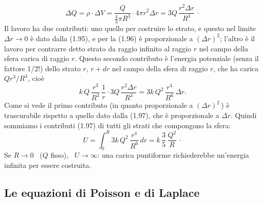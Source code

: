 \begin{enumerate}
\begin{equation}
\Delta Q=\rho\cdot\Delta V=\frac{Q}{\frac43\pi R^3}\cdot4\pi r^2\Delta r=3Q\,\frac{r^2\Delta r}{R^3}\,\cdot
\tag{1.96}
\end{equation}
Il lavoro ha due contributi: uno quello per costruire lo strato, e questo nel limite $\Delta r\to0$ è dato dalla (1.95), e per la (1.96) è proporzionale a $(\Delta r)^2$; l'altro è il lavoro per contrarre detto strato da raggio infinito al raggio $r$ nel campo della sfera carica di raggio $r$. Questo secondo contributo è l'energia potenziale (senza il fattore 1/2!) dello strato $r$, $r+dr$ nel campo della sfera di raggio $r$, che ha carica $Qr^3/R^3$, cioè
\begin{equation}
k\,Q\,\frac{r^3}{R^3}\,\frac1r\cdot3Q\,\frac{r^2\Delta r}{R^3}=3k\,Q^2\,\frac{r^4}{R^6}\,\Delta r.
\tag{1.97}
\end{equation}
Come si vede il primo contributo (in quanto proporzionale a $(\Delta r)^2$\,) è trascurabile rispetto a quello dato dalla (1.97), che è proporzionale a $\Delta r$. Quindi sommiamo i contributi (1.97) di tutti gli strati che compongono la sfera:
\begin{equation}
U=\int_0^R3k\,Q^2\,\frac{r^4}{R^6}\,dr=k\,\frac35\,\frac{Q^2}{R}\,\cdot
\tag{1.98}
\end{equation}
Se $R\to0$ \ ($Q$ fisso), \ $U\to\infty$: una carica puntiforme richiederebbe un'energia infinita per essere costruita.
\end{enumerate}

\subsection{Le equazioni di Poisson e di Laplace}

